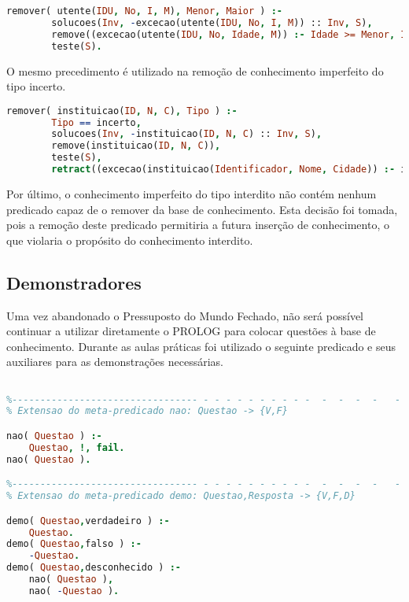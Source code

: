 \documentclass[a4paper]{article}
\begin{document}
\begin{lstlisting}[language=Prolog, caption=Predicado que permite a remoção de conhecimento imperfeito do tipo impreciso de um utente referente a um intervalo.]
remover( utente(IDU, No, I, M), Menor, Maior ) :-
        solucoes(Inv, -excecao(utente(IDU, No, I, M)) :: Inv, S),
        remove((excecao(utente(IDU, No, Idade, M)) :- Idade >= Menor, Idade =< Maior)),
        teste(S).
\end{lstlisting}

O mesmo precedimento é utilizado na remoção de conhecimento imperfeito do tipo incerto.

\begin{lstlisting}[language=Prolog, caption=Predicado que permite a remoção de conhecimento imperfeito do tipo incerto relativo ao nome de uma instituição.]
remover( instituicao(ID, N, C), Tipo ) :-
        Tipo == incerto,
        solucoes(Inv, -instituicao(ID, N, C) :: Inv, S),
        remove(instituicao(ID, N, C)),
        teste(S),
        retract((excecao(instituicao(Identificador, Nome, Cidade)) :- instituicao(Identificador, N, Cidade))).
\end{lstlisting}

Por último, o conhecimento imperfeito do tipo interdito não contém nenhum predicado capaz de o remover da base de conhecimento. Esta decisão foi tomada, pois a remoção deste predicado permitiria a futura inserção de conhecimento, o que violaria o propósito do conhecimento interdito.



\subsection{Demonstradores}

\hspace{3mm} Uma vez abandonado o Pressuposto do Mundo Fechado, não será possível continuar a utilizar diretamente o PROLOG para colocar questões à base de conhecimento. Durante as aulas práticas foi utilizado o seguinte predicado e seus auxiliares para as demonstrações necessárias.

\begin{lstlisting}[language=Prolog, caption=Demonstrador básico resultante da Extensão à Programação em Lógica. ]

%--------------------------------- - - - - - - - - - -  -  -  -  -   -
% Extensao do meta-predicado nao: Questao -> {V,F}

nao( Questao ) :-
    Questao, !, fail.
nao( Questao ).

%--------------------------------- - - - - - - - - - -  -  -  -  -   -
% Extensao do meta-predicado demo: Questao,Resposta -> {V,F,D}

demo( Questao,verdadeiro ) :-
    Questao.
demo( Questao,falso ) :-
    -Questao.
demo( Questao,desconhecido ) :-
    nao( Questao ),
    nao( -Questao ).
    
\end{lstlisting}
\end{document}
